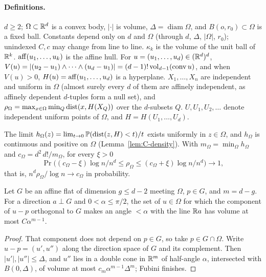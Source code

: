 \paragraph{Definitions.} $d \ge 2$; $\Omega \subset \mathbb{R}^d$ is a convex body, $|\cdot|$ is volume, $\Delta = \operatorname{diam}\Omega$,
and $B(o, r_0) \subset \Omega$ is a fixed ball. Constants depend only on $d$ and $\Omega$ (through $d$, $\Delta$,
$|\Omega|$, $r_0$); unindexed $C, c$ may change from line to line. $\kappa_k$ is the volume of the unit ball of $\mathbb{R}^k$. $\operatorname{aff}(u_1, \dots, u_k)$ is the affine hull. For
$u = (u_1, \dots, u_d) \in (\mathbb{R}^d)^d$, $V(u) = |(u_2 - u_1) \wedge \dots \wedge (u_d - u_1)| = (d-1)!\operatorname{vol}_{d-1}(\operatorname{conv}u)$, and
when $V(u) > 0$, $H(u) = \operatorname{aff}(u_1, \dots, u_d)$ is a hyperplane. $X_1, \dots, X_n$ are independent and uniform in
$\Omega$ (almost surely every $d$ of them are affinely independent, as affinely dependent $d$-tuples form a
null set), and $\rho_\Omega = \max_{x \in \Omega}\min_Q\operatorname{dist}(x, H(X_Q))$ over the $d$-subsets $Q$. $U, U_1, U_2, \dots$
denote independent uniform points of $\Omega$, and $H = H(U_1, \dots, U_d)$.

\begin{proposition}\label{prop:C-all-d}
The limit $h_\Omega(z) = \lim_{t \to 0}\mathbb{P}(\operatorname{dist}(z, H) < t)/t$ exists uniformly in $z \in \Omega$, and $h_\Omega$ is
continuous and positive on $\Omega$ (Lemma~\ref{lem:C-density}). With $m_\Omega = \min_\Omega h_\Omega$ and
$c_\Omega = d^2\,d!/m_\Omega$, for every $\xi > 0$
\[
  \Pr\bigl((c_\Omega - \xi)\log n/n^d \le \rho_\Omega \le (c_\Omega + \xi)\log n/n^d\bigr) \to 1,
\]
that is, $n^d\rho_\Omega/\log n \to c_\Omega$ in probability.
\end{proposition}

\begin{lemma}[Cones]\label{lem:C-cone}
Let $G$ be an affine flat of dimension $g \le d - 2$ meeting $\Omega$, $p \in G$, and $m = d - g$. For a direction
$a \perp G$ and $0 < \alpha \le \pi/2$, the set of $u \in \Omega$ for which the component of $u - p$ orthogonal to
$G$ makes an angle $< \alpha$ with the line $\mathbb{R} a$ has volume at most $C\alpha^{m-1}$.
\end{lemma}

\begin{proof}
That component does not depend on $p \in G$, so take $p \in G \cap \Omega$. Write $u - p = (u', u'')$ along the
direction space of $G$ and its complement. Then $|u'|, |u''| \le \Delta$, and $u''$ lies in a double cone in $\mathbb{R}^m$ of
half-angle $\alpha$, intersected with $B(0, \Delta)$, of volume at most $c_m\alpha^{m-1}\Delta^m$; Fubini finishes.
\end{proof}

